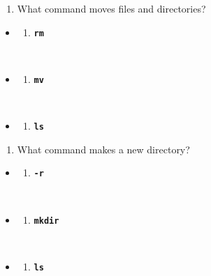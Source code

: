 \documentclass[
  letterpaper,
  DIV=11,
  numbers=noendperiod]{scrreprt}
\providecommand{\tightlist}{%
  \setlength{\itemsep}{0pt}\setlength{\parskip}{0pt}}
\begin{document}
\begin{enumerate}
\def\labelenumi{\arabic{enumi}.}
\setcounter{enumi}{1}
\tightlist
\item
  What command moves files and directories?
\end{enumerate}

\begin{itemize}
\tightlist
\item
  \begin{enumerate}
  \def\labelenumi{(\Alph{enumi})}
  \tightlist
  \item
    \textbf{\texttt{rm}}\strut \\
  \end{enumerate}
\item
  \begin{enumerate}
  \def\labelenumi{(\Alph{enumi})}
  \setcounter{enumi}{1}
  \tightlist
  \item
    \textbf{\texttt{mv}}\strut \\
  \end{enumerate}
\item
  \begin{enumerate}
  \def\labelenumi{(\Alph{enumi})}
  \setcounter{enumi}{2}
  \tightlist
  \item
    \textbf{\texttt{ls}}
  \end{enumerate}
\end{itemize}

\begin{enumerate}
\def\labelenumi{\arabic{enumi}.}
\setcounter{enumi}{2}
\tightlist
\item
  What command makes a new directory?
\end{enumerate}

\begin{itemize}
\tightlist
\item
  \begin{enumerate}
  \def\labelenumi{(\Alph{enumi})}
  \tightlist
  \item
    \textbf{\texttt{-r}}\strut \\
  \end{enumerate}
\item
  \begin{enumerate}
  \def\labelenumi{(\Alph{enumi})}
  \setcounter{enumi}{1}
  \tightlist
  \item
    \textbf{\texttt{mkdir}}\strut \\
  \end{enumerate}
\item
  \begin{enumerate}
  \def\labelenumi{(\Alph{enumi})}
  \setcounter{enumi}{2}
  \tightlist
  \item
    \textbf{\texttt{ls}}
  \end{enumerate}
\end{itemize}
\end{document}
